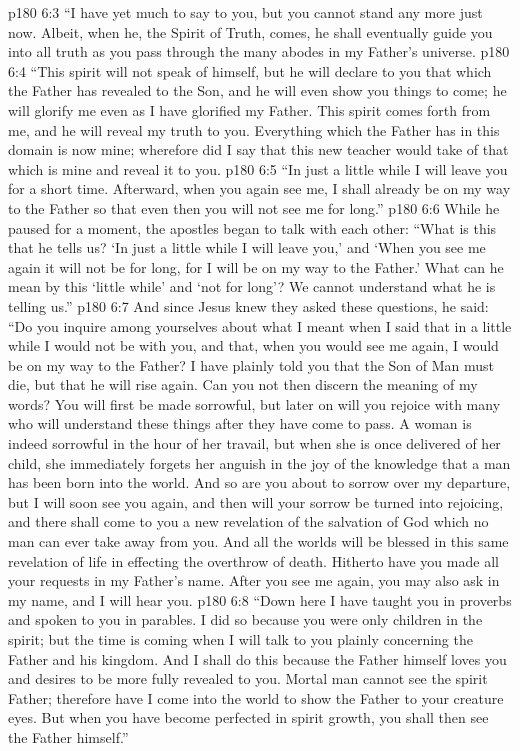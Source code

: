 \vs p180 6:3 \textcolor{ubdarkred}{“I have yet much to say to you, but you cannot stand any more just now. Albeit, when he, the Spirit of Truth, comes, he shall eventually guide you into all truth as you pass through the many abodes in my Father’s universe.}
\vs p180 6:4 \textcolor{ubdarkred}{“This spirit will not speak of himself, but he will declare to you that which the Father has revealed to the Son, and he will even show you things to come; he will glorify me even as I have glorified my Father. This spirit comes forth from me, and he will reveal my truth to you. Everything which the Father has in this domain is now mine; wherefore did I say that this new teacher would take of that which is mine and reveal it to you.}
\vs p180 6:5 \textcolor{ubdarkred}{“In just a little while I will leave you for a short time. Afterward, when you again see me, I shall already be on my way to the Father so that even then you will not see me for long.”}
\vs p180 6:6 While he paused for a moment, the apostles began to talk with each other: “What is this that he tells us? ‘In just a little while I will leave you,’ and ‘When you see me again it will not be for long, for I will be on my way to the Father.’ What can he mean by this ‘little while’ and ‘not for long’? We cannot understand what he is telling us.”
\vs p180 6:7 And since Jesus knew they asked these questions, he said: \textcolor{ubdarkred}{“Do you inquire among yourselves about what I meant when I said that in a little while I would not be with you, and that, when you would see me again, I would be on my way to the Father? I have plainly told you that the Son of Man must die, but that he will rise again. Can you not then discern the meaning of my words? You will first be made sorrowful, but later on will you rejoice with many who will understand these things after they have come to pass. A woman is indeed sorrowful in the hour of her travail, but when she is once delivered of her child, she immediately forgets her anguish in the joy of the knowledge that a man has been born into the world. And so are you about to sorrow over my departure, but I will soon see you again, and then will your sorrow be turned into rejoicing, and there shall come to you a new revelation of the salvation of God which no man can ever take away from you. And all the worlds will be blessed in this same revelation of life in effecting the overthrow of death. Hitherto have you made all your requests in my Father’s name. After you see me again, you may also ask in my name, and I will hear you.}
\vs p180 6:8 \textcolor{ubdarkred}{“Down here I have taught you in proverbs and spoken to you in parables. I did so because you were only children in the spirit; but the time is coming when I will talk to you plainly concerning the Father and his kingdom. And I shall do this because the Father himself loves you and desires to be more fully revealed to you. Mortal man cannot see the spirit Father; therefore have I come into the world to show the Father to your creature eyes. But when you have become perfected in spirit growth, you shall then see the Father himself.”}\plusone
